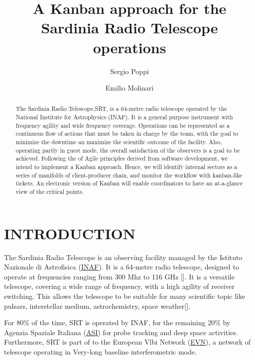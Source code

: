 \documentclass[a4paper]{spie}  %
\title{A Kanban approach for the Sardinia Radio Telescope operations}
\author[a]{Sergio Poppi}
\author[a]{Emilio Molinari}
\affil[a]{INAF Osservatorio Astronomico di Cagliari, Via della Scienza 5, Selargius (CA) , Italy}
\begin{document}
 
\maketitle

\begin{abstract}
The Sardinia Radio Telescope,SRT,  is a 64-metre  radio telescope  operated by the  National Institute for Astrophysics (INAF). It is a general purpose instrument  with frequency agility and wide frequency coverage. 
Operations can be represented as a continuous flow of actions that must be taken in charge by the team, with the goal to minimize  the downtime an maximize the scientific outcome of the facility. Also, operating partly in guest mode, the overall satisfaction of the observers is a goal to be achieved.
Following  the of Agile principles derived from software development, we intend to implement a  Kanban approach. Hence, we will identify internal sectors as a series of  manifolds  of client-producer chain, and monitor the workflow with kanban-like tickets. An electronic version of Kanban will enable coordinators  to have an at-a-glance view of the critical points.
\end{abstract}


\section{INTRODUCTION}
\label{sec:intro}  %



The Sardinia Radio Telescope is an observing facility managed by the Istituto Nazionale di Astrofisica (\href{http://www.inaf.it}{INAF}).  
It is a 64-metre radio telescope, designed to operate  at  frequencies ranging from 300 Mhz to 116 GHz  [].
It is a versatile telescope, covering a wide range of frequency, with a high agility of receiver switching. This  allows the telescope to be suitable for many scientific topic like pulsars, interstellar medium, astrochemistry, space weather[].

For 80\% of the time, SRT is operated by INAF, for  the remaining 20\% by Agenzia Spaziale Italiana (\href{http://www.asi.it}{ASI})  for probe tracking and deep space  activities. 
Furthermore, SRT is part of  to the European Vlbi Network (\href{https://www.evlbi.org/}{EVN}), a network of telescope operating in Very-long baseline interferometric mode.
\end{document}
